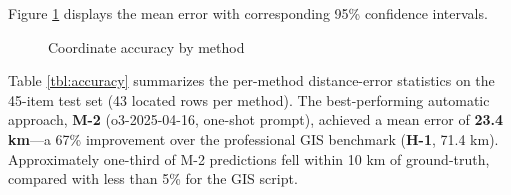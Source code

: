 Figure \ref{fig:accuracy_bar} displays the mean error with corresponding
95\% confidence intervals.

\begin{figure}
\centering
{}
\caption{Coordinate accuracy by method}\label{fig:accuracy_bar}
\end{figure}

Table \ref{tbl:accuracy} summarizes the per-method distance-error
statistics on the 45-item test set (43 located rows per method). The
best-performing automatic approach, \textbf{M-2} (o3-2025-04-16,
one-shot prompt), achieved a mean error of \textbf{23.4 km}---a 67\%
improvement over the professional GIS benchmark (\textbf{H-1}, 71.4 km).
Approximately one-third of M-2 predictions fell within 10 km of
ground-truth, compared with less than 5\% for the GIS script.

